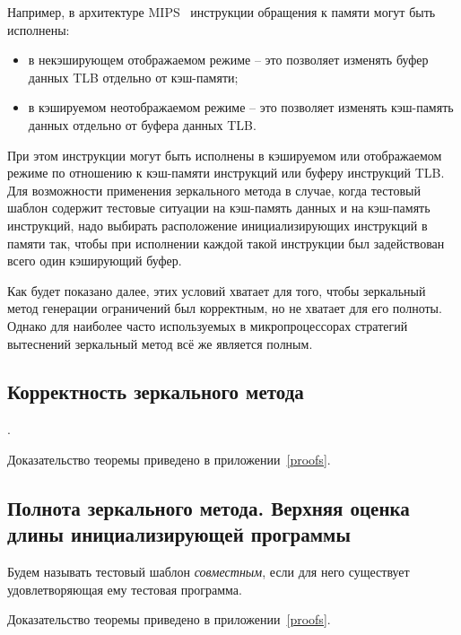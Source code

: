 Например, в архитектуре MIPS~\cite{mips64_II} инструкции обращения к
памяти могут быть исполнены:
\begin{itemize}
  \item в некэширующем отображаемом режиме -- это позволяет изменять
  буфер данных TLB отдельно от кэш-памяти;
  \item в кэшируемом неотображаемом режиме -- это позволяет изменять
  кэш-память данных отдельно от буфера данных TLB.
\end{itemize}

При этом инструкции могут быть исполнены в кэшируемом или
отображаемом режиме по отношению к кэш-памяти инструкций или буферу
инструкций TLB. Для возможности применения зеркального метода в
случае, когда тестовый шаблон содержит тестовые ситуации на
кэш-память данных и на кэш-память инструкций, надо выбирать
расположение инициализирующих инструкций в памяти так, чтобы при
исполнении каждой такой инструкции был задействован всего один
кэширующий буфер.

Как будет показано далее, этих условий хватает для того, чтобы
зеркальный метод генерации ограничений был корректным, но не хватает
для его полноты. Однако для наиболее часто используемых в
микропроцессорах стратегий вытеснений зеркальный метод всё же
является полным.

\subsection{Корректность зеркального метода}

\begin{theorem}\label{mirror_correctness} \CorrectnessMirror.
\end{theorem}

Доказательство теоремы приведено в приложении~\ref{proofs}.


\subsection{Полнота зеркального метода. Верхняя оценка длины
инициализирующей программы}

Будем называть тестовый шаблон \emph{совместным}, если для него
существует удовлетворяющая ему тестовая программа.

\begin{theorem}\label{mirror_fullness} \FullnessMirror
\end{theorem}
Доказательство теоремы приведено в приложении~\ref{proofs}.

